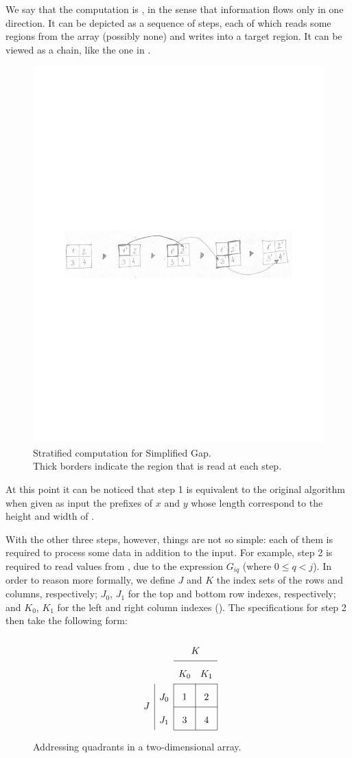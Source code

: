We say that the computation is ,
in the sense that information flows only in one direction. It can be depicted as
a sequence of steps, each of which reads some regions from the array (possibly none)
and writes into a target region. It can be viewed as a chain, like the one in
.

\begin{figure}
\includegraphics[width=.47\textwidth]{img/gap-stratify1}
\caption[caption]{\label{intro:chain}
  Stratified computation for Simplified Gap. \\[.2em]
  Thick borders indicate the region that is read at each step.}
\end{figure}

At this point it can be noticed that step 1 is equivalent to the original
algorithm when given as input the prefixes of $x$ and $y$ whose length correspond to the
height and width of .

With the other three steps, however, things are not so simple:
each of them is required to process some data in addition to the input.
For example, step 2 is required to read values from , due to the expression
$G_{iq}$ (where $\scriptstyle 0\leq q<j$).
In order to reason more formally, we define $J$ and $K$ the index sets of the rows
and columns, respectively; $J_0$, $J_1$ for the top and bottom row indexes, respectively;
and $K_0$, $K_1$ for the left and right column indexes ().
The specifications for step 2 then take the following form:

\begin{figure}
\[
\renewcommand\arraystretch{2}
\begin{array}{c|c|c|c|}
  \multicolumn{2}{c}{} & \multicolumn{2}{c}{K} \\ \cline{3-4}
  \multicolumn{2}{c}{} & \multicolumn{1}{c}{K_0}  & \multicolumn{1}{c}{K_1}\\ \cline{3-4}
  \multirow{2}{*}{$J$} & J_0 & 1 & 2 \\ \cline{3-4}
    & J_1 & 3 & 4 \\ \cline{3-4}
\end{array}
\]
\caption{\label{intro:slice G}
  Addressing quadrants in a two-dimensional array.}
\end{figure}

